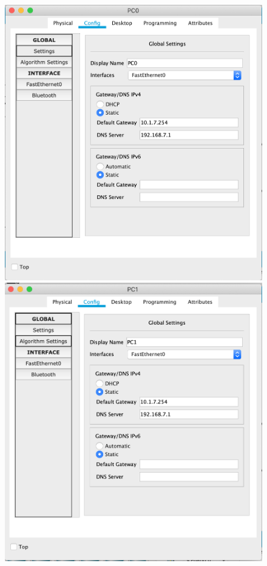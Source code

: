 \documentclass[a4paper,12pt]{article}
\begin{document}
	\begin{figure}[h!]
		\begin{minipage}[b]{0.32\textwidth}
			\includegraphics[width=\textwidth]{5.1.png}
		\end{minipage}
		\begin{minipage}[b]{0.32\textwidth}
			\includegraphics[width=\textwidth]{5.2.png}

\end{minipage}
\end{figure}
\end{document}
